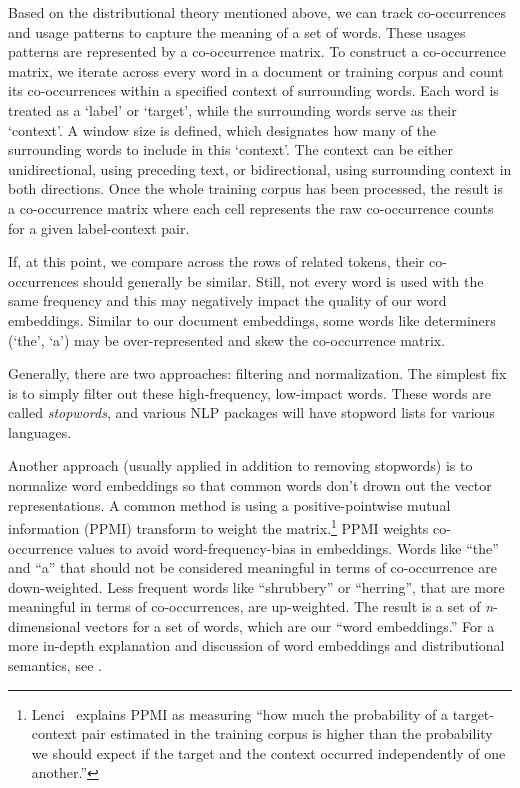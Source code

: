 Based on the distributional theory mentioned above, we can track co-occurrences and usage patterns to capture the meaning of a set of words. These usages patterns are represented by a co-occurrence matrix. To construct a co-occurrence matrix, we iterate across every word in a document or training corpus and count its co-occurrences within a specified context of surrounding words. Each word is treated as a `label' or `target', while the surrounding words serve as their `context'. A window size is defined, which designates how many of the surrounding words to include in this `context'. The context can be either unidirectional, using  preceding text, or bidirectional, using surrounding context in both directions. Once the whole training corpus has been processed, the result is a co-occurrence matrix where each cell represents the raw co-occurrence counts for a given label-context pair. 

If, at this point, we compare across the rows of related tokens, their co-occurrences should generally be similar. Still, not every word is used with the same frequency and this may negatively impact the quality of our word embeddings. Similar to our document embeddings, some words like determiners (`the', `a') may be over-represented and skew the co-occurrence matrix. 

Generally, there are two approaches: filtering and normalization. The simplest fix is to simply filter out these high-frequency, low-impact words. These words are called  \emph{stopwords}, and various NLP packages will have stopword lists for various languages.

Another approach (usually applied in addition to removing stopwords) is to normalize word embeddings so that common words don't drown out the vector representations. A common method is using a positive-pointwise mutual information (PPMI) transform to weight the matrix.\footnote{Lenci~\cite{lenci2018distributional} explains PPMI as measuring ``how much the probability of a target-context pair estimated in the training corpus is higher than the probability we should expect if the target and the context occurred independently of one another.''} PPMI weights co-occurrence values to avoid word-frequency-bias in embeddings. Words like ``the'' and ``a'' that should not be considered meaningful in terms of co-occurrence are down-weighted. Less frequent words like ``shrubbery'' or ``herring'', that are more meaningful in terms of co-occurrences, are up-weighted. The result is a set of \textit{n}-dimensional vectors for a set of words, which are our ``word embeddings.'' For a more in-depth explanation and discussion of word embeddings and distributional semantics, see \cite{lenci2018distributional}.

